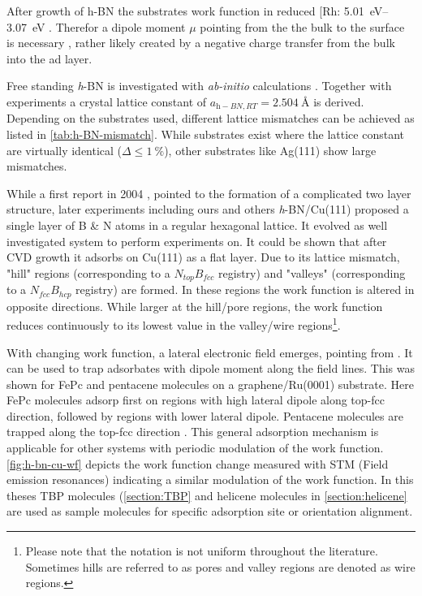After growth of h-BN the substrates work function in reduced [Rh: \SIrange{5.01}{3.07}{\eV} \cite{gomez_diaz_hexagonal_2013}. Therefor a dipole moment $\mu$ pointing from the the bulk to the surface is necessary \cite{roman_periodic_2013}, rather likely created by a negative charge transfer from the bulk into the ad layer.

Free standing \textit{h}-BN is investigated with \textit{ab-initio} calculations \cite{han_effects_2014,mortazavi_investigation_2012,topsakal_first-principles_2009,peng_mechanical_2012}. Together with experiments \cite{paszkowicz_lattice_2002} a crystal lattice constant of $a_{\textit{h}-BN, RT}=\SI{2.504}{\angstrom}$ is derived. Depending on the substrates used, different lattice mismatches can be achieved as listed in \autoref{tab:h-BN-mismatch}. While substrates exist where the lattice constant are virtually identical ($\Delta \leq \SI{1}{\percent}$), other substrates like Ag(111) show large mismatches.

While a first report in 2004 \cite{corso_boron_2004}, pointed to the formation of a complicated two layer structure, later experiments \cite{roth_chemical_2013, li_grain_2015} including ours \cite{joshi_boron_2012, schwarz_corrugation_2017} and others \textit{h}-BN/Cu(111) proposed a single layer of B \& N atoms in a regular hexagonal lattice. It evolved as well investigated system to perform experiments on. It could be shown that after CVD growth it adsorbs on Cu(111) as a flat layer. Due to its  lattice mismatch, "hill" regions  (corresponding to a $N_{top}B_{fcc}$ registry) and "valleys" (corresponding to a $N_{fcc}B_{hcp}$ registry) are formed. In these regions the work function is altered in opposite directions. While larger at the hill/pore regions, the work function reduces continuously to its lowest value in the valley/wire regions\footnote{Please note that the notation is not uniform throughout the literature. Sometimes hills are referred to as pores and valley regions are denoted as wire regions.}. 

With changing work function, a lateral electronic field emerges, pointing from \underline{\qquad \qquad}. It can be used to trap adsorbates with dipole moment along the field lines. This was shown for FePc and pentacene molecules on a graphene/Ru(0001) substrate. Here FePc molecules adsorp first on regions with high lateral dipole along top-fcc direction, followed by regions with lower lateral dipole. Pentacene molecules are trapped along the top-fcc direction \cite{zhang_assembly_2011}. This general adsorption mechanism is applicable for other systems with periodic modulation of the work function. \autoref{fig:h-bn-cu-wf} depicts the work function change measured  with STM (Field emission resonances) indicating a similar modulation of the work function. In this theses TBP molecules (\autoref{section:TBP} and helicene molecules in \autoref{section:helicene} are used as sample molecules for specific adsorption site or orientation alignment.

